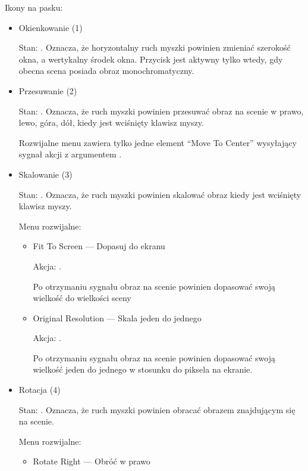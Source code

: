 Ikony na pasku:
\begin{itemize}
    \item Okienkowanie (1)

          Stan: .
          Oznacza, że horyzontalny ruch myszki powinien zmieniać szerokość okna, a wertykalny środek okna.
          Przycisk jest aktywny tylko wtedy, gdy obecna scena posiada obraz monochromatyczny.

    \item Przesuwanie (2)

          Stan: .
          Oznacza, że ruch myszki powinien przesuwać obraz na scenie w prawo, lewo, góra, dół, kiedy jest wciśnięty klawisz myszy.

          Rozwijalne menu zawiera tylko jedne element \enquote{Move To Center} wysyłający sygnał akcji z argumentem .

    \item Skalowanie (3)

          Stan: .
          Oznacza, że ruch myszki powinien skalować obraz kiedy jest wciśnięty klawisz myszy.

          Menu rozwijalne:
          \begin{itemize}
              \item Fit To Screen --- Dopasuj do ekranu

                    Akcja: .

                    Po otrzymaniu sygnału obraz na scenie powinien dopasować swoją wielkość do wielkości sceny

              \item Original Resolution --- Skala jeden do jednego

                    Akcja: .

                    Po otrzymaniu sygnału obraz na scenie powinien dopasować swoją wielkość jeden do jednego w stosunku do piksela na ekranie.

          \end{itemize}

    \item Rotacja (4)

          Stan: .
          Oznacza, że ruch myszki powinien obracać obrazem znajdującym się na scenie.

          Menu rozwijalne:
          \begin{itemize}
              \item Rotate Right --- Obróć w prawo


\end{itemize}
\end{itemize}
